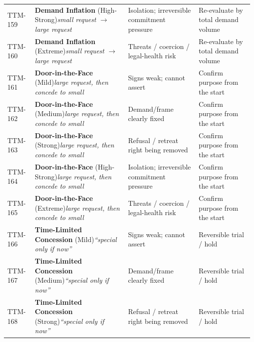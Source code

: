 \begin{small}
\begin{longtable}{@{}p{1.4cm}p{3.6cm}p{3.6cm}p{4.0cm}@{}}
\addlinespace[0.2em]
TTM-159 & \textbf{Demand Inflation} (High-Strong)\newline\textit{\footnotesize small request $\to$ large request} & Isolation; irreversible commitment pressure & Re-evaluate by total demand volume \\
\addlinespace[0.2em]
TTM-160 & \textbf{Demand Inflation} (Extreme)\newline\textit{\footnotesize small request $\to$ large request} & Threats / coercion / legal-health risk & Re-evaluate by total demand volume \\
\addlinespace[0.2em]
TTM-161 & \textbf{Door-in-the-Face} (Mild)\newline\textit{\footnotesize large request, then concede to small} & Signs weak; cannot assert & Confirm purpose from the start \\
\addlinespace[0.2em]
TTM-162 & \textbf{Door-in-the-Face} (Medium)\newline\textit{\footnotesize large request, then concede to small} & Demand/frame clearly fixed & Confirm purpose from the start \\
\addlinespace[0.2em]
TTM-163 & \textbf{Door-in-the-Face} (Strong)\newline\textit{\footnotesize large request, then concede to small} & Refusal / retreat right being removed & Confirm purpose from the start \\
\addlinespace[0.2em]
TTM-164 & \textbf{Door-in-the-Face} (High-Strong)\newline\textit{\footnotesize large request, then concede to small} & Isolation; irreversible commitment pressure & Confirm purpose from the start \\
\addlinespace[0.2em]
TTM-165 & \textbf{Door-in-the-Face} (Extreme)\newline\textit{\footnotesize large request, then concede to small} & Threats / coercion / legal-health risk & Confirm purpose from the start \\
\addlinespace[0.2em]
TTM-166 & \textbf{Time-Limited Concession} (Mild)\newline\textit{\footnotesize ``special only if now''} & Signs weak; cannot assert & Reversible trial / hold \\
\addlinespace[0.2em]
TTM-167 & \textbf{Time-Limited Concession} (Medium)\newline\textit{\footnotesize ``special only if now''} & Demand/frame clearly fixed & Reversible trial / hold \\
\addlinespace[0.2em]
TTM-168 & \textbf{Time-Limited Concession} (Strong)\newline\textit{\footnotesize ``special only if now''} & Refusal / retreat right being removed & Reversible trial / hold \\

\end{longtable}
\end{small}
